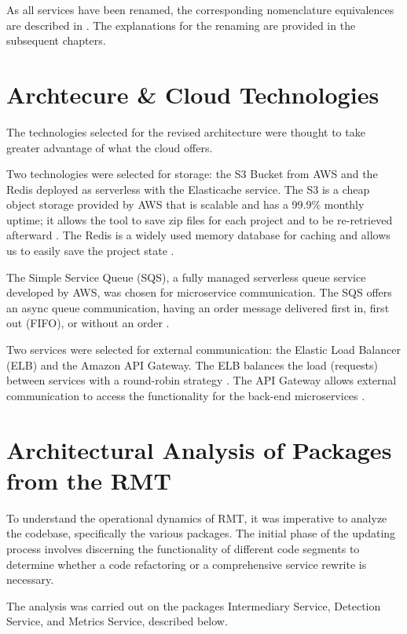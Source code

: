 As all services have been renamed, the corresponding nomenclature equivalences are described in . The explanations for the renaming are provided in the subsequent chapters.



\section{Archtecure \& Cloud Technologies}
\label{sec-arch-cloud}

The technologies selected for the revised architecture were thought to take greater advantage of what the cloud offers. 

Two technologies were selected for storage: the S3 Bucket from AWS and the Redis deployed as serverless with the Elasticache service. The S3 is a cheap object storage provided by AWS that is scalable and has a 99.9\% monthly uptime; it allows the tool to save zip files for each project and to be re-retrieved afterward \cite{S3}. The Redis is a widely used memory database for caching and allows us to easily save the project state \cite{Redis}.

The Simple Service Queue (SQS), a fully managed serverless queue service developed by AWS, was chosen for microservice communication. The SQS offers an async queue communication, having an order message delivered first in, first out (FIFO), or without an order \cite{sqs}.

Two services were selected for external communication: the Elastic Load Balancer (ELB) and the Amazon API Gateway. The ELB balances the load (requests) between services with a round-robin strategy \cite{Elb}. The API Gateway allows external communication to access the functionality for the back-end microservices \cite{Gateway}.


\section{Architectural Analysis of Packages from the RMT}
\label{sec-archtectural-analysis}

To understand the operational dynamics of RMT, it was imperative to analyze the codebase, specifically the various packages. The initial phase of the updating process involves discerning the functionality of different code segments to determine whether a code refactoring or a comprehensive service rewrite is necessary.

The analysis was carried out on the packages Intermediary Service, Detection Service, and Metrics Service, described below.

